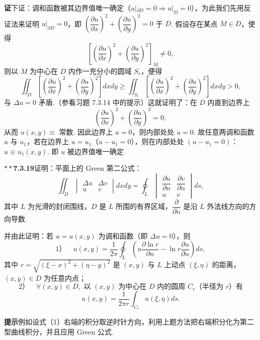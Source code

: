 \documentclass[UTF8,12pt,a4paper,fontset=fandol]{ctexart}
\begin{document}
\noindent\textbf{证}\quad 下证：调和函数被其边界值唯一确定（$u|_{\partial D}=0\Rightarrow u|_D=0$），为此我们先用反证法来证明 $u|_{\partial D}=0$，即 $\left(\dfrac{\partial u}{\partial x}\right)^2+\left(\dfrac{\partial u}{\partial y}\right)^2=0$ 于 $D$. 假设存在某点 $M\in D$，使得
\[
\left[\left(\frac{\partial u}{\partial x}\right)^2
+\left(\frac{\partial u}{\partial y}\right)^2\right]_M\ne0,
\]
则以 $M$ 为中心在 $D$ 内作一充分小的圆域 $S_r$，便得
\[
\iint_D\left[\left(\frac{\partial u}{\partial x}\right)^2
+\left(\frac{\partial u}{\partial y}\right)^2\right]dxdy
\ge
\iint_{S_r}\left[\left(\frac{\partial u}{\partial x}\right)^2
+\left(\frac{\partial u}{\partial y}\right)^2\right]dxdy>0,
\]
与 $\Delta u=0$ 矛盾.（参看习题 7.3.14 中的提示）这就证明了：在 $D$ 内直到边界上
\[
\left(\frac{\partial u}{\partial x}\right)^2
+\left(\frac{\partial u}{\partial y}\right)^2=0,
\]
从而 $u(x,y)\equiv$ 常数. 因此边界上 $u=0$，则内部处处 $u=0$. 故任意两调和函数 $u$ 与 $u_1$，若在边界上 $u=u_1$（$u-u_1=0$），则在内部处处 $(u-u_1=0)$：$u\equiv u_1(x,y)$. 即 $u$ 被边界值唯一确定.

\noindent\textbf{$**$7.3.19}\quad 证明：平面上的 Green 第二公式：
\begin{equation}
\iint_D
\begin{vmatrix}
\Delta u & \Delta v\\
u & v
\end{vmatrix}
dxdy
=\oint_L
\begin{vmatrix}
\dfrac{\partial u}{\partial n} & \dfrac{\partial v}{\partial n}\\
u & v
\end{vmatrix}ds,
\tag{1}
\end{equation}
其中 $L$ 为光滑的封闭围线，$D$ 是 $L$ 所围的有界区域，$\dfrac{\partial}{\partial n}$ 是沿 $L$ 外法线方向的方向导数.

并由此证明：若 $u=u(x,y)$ 为调和函数（即 $\Delta u=0$），则
\[
1）\quad
u(x,y)=\frac1{2\pi}\oint_L\left(u\frac{\partial\ln r}{\partial n}
-\ln r\frac{\partial u}{\partial n}\right)ds,
\tag{2}
\]
其中 $r=\sqrt{(\xi-x)^2+(\eta-y)^2}$ 是 $(x,y)$ 与 $L$ 上动点 $(\xi,\eta)$ 的距离，$(x,y)\in D$ 为任意内点；
\[
2）\quad
\forall (x,y)\in D,\text{ 以 }(x,y)\text{ 为中心在 }D\text{ 内的圆周 }C_r\text{（半径为 }r\text{）有}
\]
\[
u(x,y)=\frac1{2\pi r}\int_{C_r}u(\xi,\eta)ds.
\tag{3}
\]

\noindent\textbf{提示}\quad 例如设式（1）右端的积分取逆时针方向，利用上题方法把右端积分化为第二型曲线积分，并且应用 Green 公式.
\end{document}
